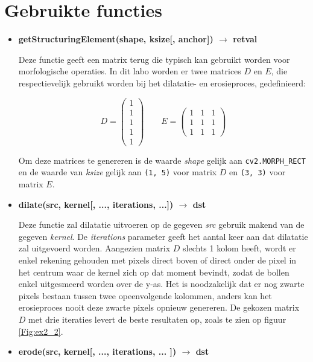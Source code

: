 \documentclass{article}
\begin{document}
	\section{Gebruikte functies}
	\begin{itemize}
		 \item \textbf{getStructuringElement(shape, ksize[, anchor]) $\rightarrow$ retval}
		 
		 Deze functie geeft een matrix terug die typisch kan gebruikt worden voor morfologische operaties. In dit labo worden er twee matrices $D$ en $E$, die respectievelijk gebruikt worden bij het dilatatie- en erosieproces, gedefinieerd:
		 
		 
		 $$D = \begin{pmatrix}
		  1 \\ 1 \\ 1 \\ 1 \\ 1
		 \end{pmatrix} \qquad 
		 E = \begin{pmatrix}
		 1 & 1 & 1 \\
		 1 & 1 & 1 \\
		 1 & 1 & 1
		 \end{pmatrix}
		 $$
		 
		 
		Om deze matrices te genereren is de waarde \textit{shape} gelijk aan \texttt{cv2.MORPH\_RECT} en de waarde van \textit{ksize} gelijk aan \texttt{(1, 5)} voor matrix $D$ en \texttt{(3, 3)} voor matrix $E$.
		 
		 \item \textbf{dilate(src, kernel[, ..., iterations, ...]) $\rightarrow$ dst}
		 
		 Deze functie zal dilatatie uitvoeren op de gegeven \textit{src} gebruik makend van de gegeven \textit{kernel}. De \textit{iterations} parameter geeft het aantal keer aan dat dilatatie zal uitgevoerd worden. Aangezien matrix $D$ slechts 1 kolom heeft, wordt er enkel rekening gehouden met pixels direct boven of direct onder de pixel in het centrum waar de kernel zich op dat moment bevindt, zodat de bollen enkel uitgesmeerd worden over de y-as. Het is noodzakelijk dat er nog zwarte pixels bestaan tussen twee opeenvolgende kolommen, anders kan het erosieproces nooit deze zwarte pixels opnieuw genereren. De gekozen matrix $D$ met drie iteraties levert de beste resultaten op, zoals te zien op figuur \ref{Fig:ex2_2}.
		 
		 \item \textbf{erode(src, kernel[, ..., iterations, ... ]) $\rightarrow$ dst}
		 

\end{itemize}
\end{document}
